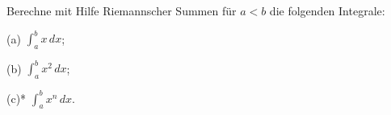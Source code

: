\begin{prob} 
Berechne mit Hilfe Riemannscher Summen f\"ur $a<b$ die folgenden Integrale:

(a) $\int_a^b x\,dx$;

(b) $\int_a^b x^2\,dx$;

(c)* $\int_a^b x^n\,dx$.
\end{prob}
